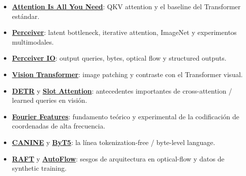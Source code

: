 {\small
\begin{itemize}[nosep,leftmargin=*]
  \item \href{https://arxiv.org/abs/1706.03762}{\textbf{Attention Is All You Need}}: QKV attention y el baseline del Transformer estándar.
  \item \href{https://arxiv.org/abs/2103.03206}{\textbf{Perceiver}}: latent bottleneck, iterative attention, ImageNet y experimentos multimodales.
  \item \href{https://arxiv.org/abs/2107.14795}{\textbf{Perceiver IO}}: output queries, bytes, optical flow y structured outputs.
  \item \href{https://arxiv.org/abs/2010.11929}{\textbf{Vision Transformer}}: image patching y contraste con el Transformer visual.
  \item \href{https://arxiv.org/abs/2005.12872}{\textbf{DETR}} y \href{https://arxiv.org/abs/2006.15055}{\textbf{Slot Attention}}: antecedentes importantes de cross-attention / learned queries en visión.
  \item \href{https://arxiv.org/abs/2006.10739}{\textbf{Fourier Features}}: fundamento teórico y experimental de la codificación de coordenadas de alta frecuencia.
  \item \href{https://arxiv.org/abs/2103.06874}{\textbf{CANINE}} y \href{https://arxiv.org/abs/2105.13626}{\textbf{ByT5}}: la línea tokenization-free / byte-level language.
  \item \href{https://arxiv.org/abs/2003.12039}{\textbf{RAFT}} y \href{https://arxiv.org/abs/2104.14544}{\textbf{AutoFlow}}: sesgos de arquitectura en optical-flow y datos de synthetic training.
\end{itemize}
}


